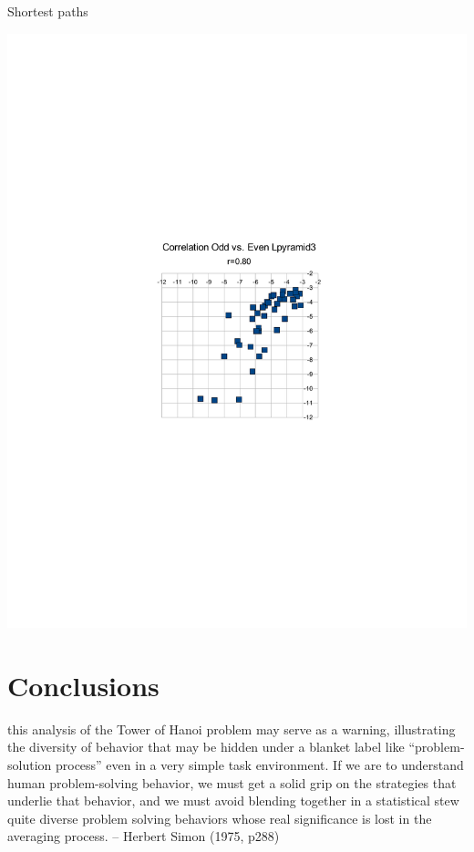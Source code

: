 \documentclass[xcolor=table,handout]{beamer}
\begin{document}
\begin{frame}{Shortest paths}
\centerline{
 \includegraphics[trim= 10cm 10cm 10cm 10cm,height=.9\textheight]{lpyramid3.pdf}}
\end{frame}


\section{Conclusions}
\label{sec:conclusions}

\begin{frame}
  this analysis of the Tower of Hanoi problem may serve as a warning,
  illustrating the diversity of behavior that may be hidden under a
  blanket label like ``problem-solution process'' even in a very
  simple task environment. If we are to understand human
  problem-solving behavior, we must get a solid grip on the strategies
  that underlie that behavior, and we must avoid blending together in
  a statistical stew quite diverse problem solving behaviors whose
  real significance is lost in the averaging process. -- Herbert Simon
  (1975, p288)
\end{frame}
\end{document}
